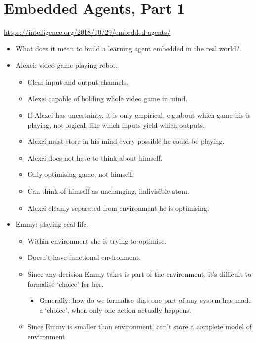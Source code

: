 \section{Embedded Agents, Part 1}

\url{https://intelligence.org/2018/10/29/embedded-agents/}

\begin{itemize}
    \item What does it mean to build a learning agent embedded in the real world?
    \item Alexei: video game playing robot.
    \begin{itemize}
        \item Clear input and output channels.
        \item Alexei capable of holding whole video game in mind.
        \item If Alexei has uncertainty, it is only empirical, e.g.\@ about which game his is playing, not logical, like which inputs yield which outputs.
        \item Alexei must store in his mind every possible he could be playing.
        \item Alexei does not have to think about himself.
        \item Only optimising game, not himself.
        \item Can think of himself as unchanging, indivisible atom.
        \item Alexei cleanly separated from environment he is optimising.
    \end{itemize}
    \item Emmy: playing real life.
    \begin{itemize}
        \item Within environment she is trying to optimise.
        \item Doesn't have functional environment.
        \pagebreak
        \item Since any decision Emmy takes is part of the environment, it's difficult to formalise `choice' for her.
        \begin{itemize}
            \item Generally: how do we formalise that one part of any system has made a `choice', when only one action actually happens.
        \end{itemize}
        \item Since Emmy is smaller than environment, can't store a complete model of environment.
        \begin{itemize}

\end{itemize}
\end{itemize}
\end{itemize}
